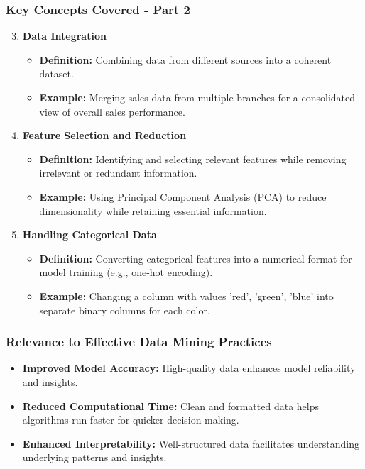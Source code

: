 \documentclass[aspectratio=169]{beamer}
\begin{document}
\begin{frame}[fragile]
    \frametitle{Key Concepts Covered - Part 2}
    \begin{enumerate}
        \setcounter{enumi}{2}
        \item \textbf{Data Integration}
        \begin{itemize}
            \item \textbf{Definition:} Combining data from different sources into a coherent dataset.
            \item \textbf{Example:} Merging sales data from multiple branches for a consolidated view of overall sales performance.
        \end{itemize}

        \item \textbf{Feature Selection and Reduction}
        \begin{itemize}
            \item \textbf{Definition:} Identifying and selecting relevant features while removing irrelevant or redundant information.
            \item \textbf{Example:} Using Principal Component Analysis (PCA) to reduce dimensionality while retaining essential information.
        \end{itemize}

        \item \textbf{Handling Categorical Data}
        \begin{itemize}
            \item \textbf{Definition:} Converting categorical features into a numerical format for model training (e.g., one-hot encoding).
            \item \textbf{Example:} Changing a column with values 'red', 'green', 'blue' into separate binary columns for each color.
        \end{itemize}
    \end{enumerate}
\end{frame}

\begin{frame}[fragile]
    \frametitle{Relevance to Effective Data Mining Practices}
    \begin{itemize}
        \item \textbf{Improved Model Accuracy:} High-quality data enhances model reliability and insights.
        \item \textbf{Reduced Computational Time:} Clean and formatted data helps algorithms run faster for quicker decision-making.
        \item \textbf{Enhanced Interpretability:} Well-structured data facilitates understanding underlying patterns and insights.
    \end{itemize}
\end{frame}
\end{document}
